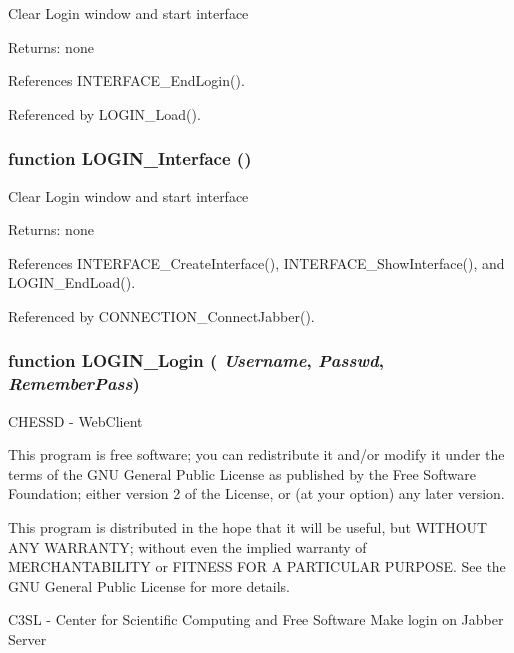 Clear Login window and start interface

\begin{Desc}
\item[Returns:]none \end{Desc}


References INTERFACE\_\-EndLogin().

Referenced by LOGIN\_\-Load().
\subsubsection{\setlength{\rightskip}{0pt plus 5cm}function LOGIN\_\-Interface ()}\label{login_2login_8js_cb562b964b2ab10a402111cd1e7c1d9f}


Clear Login window and start interface

\begin{Desc}
\item[Returns:]none \end{Desc}


References INTERFACE\_\-CreateInterface(), INTERFACE\_\-ShowInterface(), and LOGIN\_\-EndLoad().

Referenced by CONNECTION\_\-ConnectJabber().
\subsubsection{\setlength{\rightskip}{0pt plus 5cm}function LOGIN\_\-Login ( {\em Username}, \/   {\em Passwd}, \/   {\em RememberPass})}\label{login_2login_8js_73ab8ff3845c2f8dde38108edf013078}


CHESSD - WebClient

This program is free software; you can redistribute it and/or modify it under the terms of the GNU General Public License as published by the Free Software Foundation; either version 2 of the License, or (at your option) any later version.

This program is distributed in the hope that it will be useful, but WITHOUT ANY WARRANTY; without even the implied warranty of MERCHANTABILITY or FITNESS FOR A PARTICULAR PURPOSE. See the GNU General Public License for more details.

C3SL - Center for Scientific Computing and Free Software Make login on Jabber Server

